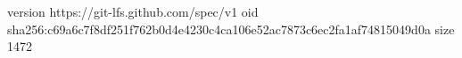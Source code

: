 version https://git-lfs.github.com/spec/v1
oid sha256:c69a6c7f8df251f762b0d4e4230c4ca106e52ac7873c6ec2fa1af74815049d0a
size 1472
